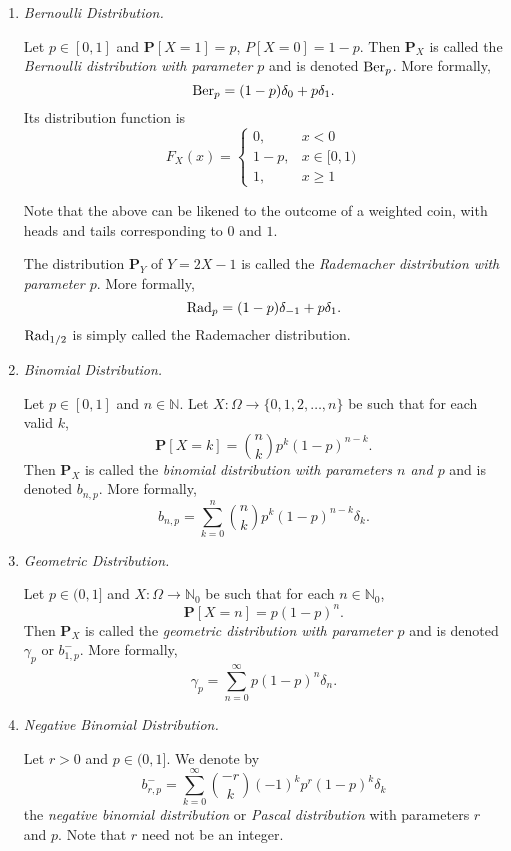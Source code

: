 \begin{enumerate}
    \item \textit{Bernoulli Distribution.}
    
    Let $p\in[0,1]$ and $\textbf{P}[X=1]=p$, $P[X=0]=1-p$. Then $\textbf{P}_X$ is called the \textit{Bernoulli distribution with parameter $p$} and is denoted $\operatorname{Ber}_p$. More formally,
    $$\operatorname{Ber}_p=(1-p)\delta_0 + p\delta_1.$$
    Its distribution function is
    $$
    F_X(x) = 
    \begin{cases}
    0, &x<0 \\
    1-p, &x\in[0,1) \\
    1, &x\geq 1
    \end{cases}
    $$
    
    Note that the above can be likened to the outcome of a weighted coin, with heads and tails corresponding to $0$ and $1$.
    
    \vspace{2mm}
    The distribution $\textbf{P}_Y$ of $Y=2X-1$ is called the \textit{Rademacher distribution with parameter $p$}. More formally,
    $$\operatorname{Rad}_p = (1-p)\delta_{-1}+p\delta_1.$$
    $\operatorname{Rad}_{1/2}$ is simply called the Rademacher distribution.
    
    \item \textit{Binomial Distribution.}
    
    Let $p\in[0,1]$ and $n\in\mathbb{N}$. Let $X:\Omega\to\{0,1,2,\ldots,n\}$ be such that for each valid $k$,
    $$\textbf{P}[X=k]=\binom{n}{k}p^k(1-p)^{n-k}.$$
    Then $\textbf{P}_X$ is called the \textit{binomial distribution with parameters $n$ and $p$} and is denoted $b_{n,p}$. More formally,
    $$b_{n,p}=\sum_{k=0}^n \binom{n}{k}p^k(1-p)^{n-k}\delta_k.$$
    
    \item \textit{Geometric Distribution.}
    
    Let $p\in(0,1]$ and $X:\Omega\to\mathbb{N}_0$ be such that for each $n\in\mathbb{N}_0$,
    $$\textbf{P}[X=n]=p(1-p)^n.$$
    Then $\textbf{P}_X$ is called the \textit{geometric distribution with parameter $p$} and is denoted $\gamma_p$ or $b_{1,p}^{-}$. More formally,
    $$\gamma_p=\sum_{n=0}^\infty p(1-p)^n\delta_n.$$
    
    \item \textit{Negative Binomial Distribution.}
    
    Let $r>0$ and $p\in(0,1]$. We denote by
    $$b^{-}_{r,p}=\sum_{k=0}^\infty \binom{-r}{k}(-1)^kp^r(1-p)^k\delta_k$$
    the \textit{negative binomial distribution} or \textit{Pascal distribution} with parameters $r$ and $p$. Note that $r$ need not be an integer.
    

\end{enumerate}
